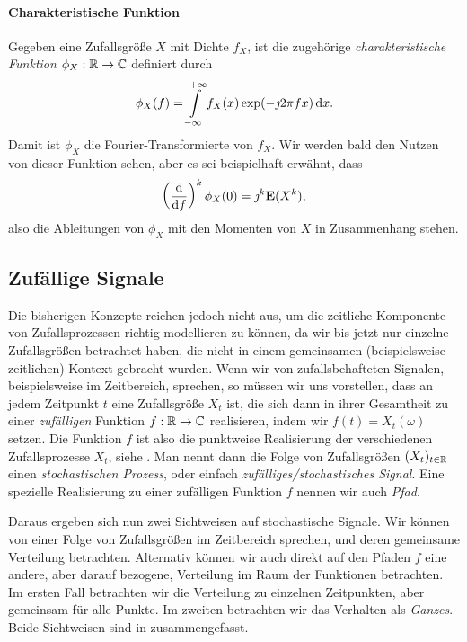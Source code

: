 \paragraph{Charakteristische Funktion}
Gegeben eine Zufallsgröße $X$ mit Dichte $f_X$, ist die zugehörige \emph{charakteristische Funktion} $\phi_X : \mathbb{R} \rightarrow \mathbb{C}$ definiert durch
\begin{equation}
    \label{eq:random:char_fun}
    \phi_X(f) = {\int\limits_{-\infty}^{+\infty}{f_X(x)\exp(-\jmath 2 \pi f x)}\,\mathrm{d}{x}}.
\end{equation}
Damit ist $\phi_X$ die Fourier-Transformierte von $f_X$.
Wir werden bald den Nutzen von dieser Funktion sehen, aber es sei beispielhaft erwähnt, dass
\[
\left(\frac{\mathrm{d}}{\mathrm{d}f}\right)^k\phi_X(0) = \jmath^k \bm{\mathrm{E}}(X^k),
\]
also die Ableitungen von $\phi_X$ mit den Momenten von $X$ in Zusammenhang stehen.
%
%
%
\subsection{Zufällige Signale}
%
Die bisherigen Konzepte reichen jedoch nicht aus, um die zeitliche Komponente von Zufallsprozessen richtig modellieren zu können, da wir bis jetzt nur einzelne Zufallsgrößen betrachtet haben, die nicht in einem gemeinsamen (beispielsweise zeitlichen) Kontext gebracht wurden.
Wenn wir von zufallsbehafteten Signalen, beispielsweise im Zeitbereich, sprechen, so müssen wir uns vorstellen, dass an jedem Zeitpunkt $t$ eine Zufallsgröße $X_t$  ist, die sich dann in ihrer Gesamtheit zu einer \emph{zufälligen} Funktion $f : \mathbb{R} \rightarrow \mathbb{C}$ realisieren, indem wir $f(t) = X_t(\omega)$ setzen.
Die Funktion $f$ ist also die punktweise Realisierung der verschiedenen Zufallsprozesse $X_t$, siehe .
Man nennt dann die Folge von Zufallsgrößen $(X_t)_{t \in \mathbb{R}}$ einen \emph{stochastischen Prozess}, oder einfach \emph{zufälliges/stochastisches Signal}.
Eine spezielle Realisierung zu einer zufälligen Funktion $f$ nennen wir auch \emph{Pfad}.

Daraus ergeben sich nun zwei Sichtweisen auf stochastische Signale. 
Wir können von einer Folge von Zufallsgrößen im Zeitbereich sprechen, und deren gemeinsame Verteilung betrachten.
Alternativ können wir auch direkt auf den Pfaden $f$ eine andere, aber darauf bezogene, Verteilung im Raum der Funktionen betrachten. 
Im ersten Fall betrachten wir die Verteilung zu einzelnen Zeitpunkten, aber gemeinsam für alle Punkte.
Im zweiten betrachten wir das Verhalten als \emph{Ganzes}.
Beide Sichtweisen sind in  zusammengefasst.

